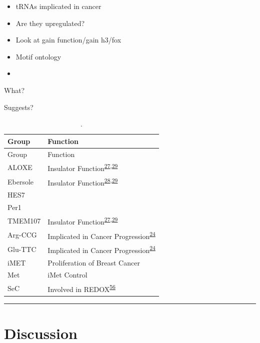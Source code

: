 \documentclass[
  11pt,
]{article}
\begin{document}
\begin{itemize}
\item
  tRNAs implicated in cancer
\item
  Are they upregulated?
\item
  Look at gain function/gain h3/fox
\item
  Motif ontology
\item
\end{itemize}

What?

Suggests?

\begin{longtable}[]{@{}ll@{}}
\caption{\label{tab:clusters}.}\tabularnewline
\toprule()
Group & Function \\
\midrule()
\endfirsthead
\toprule()
Group & Function \\
\midrule()
\endhead
ALOXE & Insulator Function\textsuperscript{\protect\hyperlink{ref-raab2011}{27},\protect\hyperlink{ref-sizer2022}{29}} \\
Ebersole & Insulator Function\textsuperscript{\protect\hyperlink{ref-Ebersole2011}{28},\protect\hyperlink{ref-sizer2022}{29}} \\
HES7 & \\
Per1 & \\
TMEM107 & Insulator Function\textsuperscript{\protect\hyperlink{ref-raab2011}{27},\protect\hyperlink{ref-sizer2022}{29}} \\
Arg-CCG & Implicated in Cancer Progression\textsuperscript{\protect\hyperlink{ref-Goodarzi2016}{24}} \\
Glu-TTC & Implicated in Cancer Progression\textsuperscript{\protect\hyperlink{ref-Goodarzi2016}{24}} \\
iMET & Proliferation of Breast Cancer \\
Met & iMet Control \\
SeC & Involved in REDOX\textsuperscript{\protect\hyperlink{ref-Sangha2022}{56}} \\
\bottomrule()
\end{longtable}

\begin{center}\rule{0.5\linewidth}{0.5pt}\end{center}

\hypertarget{discussion}{%
\section{Discussion}\label{discussion}}
\end{document}
